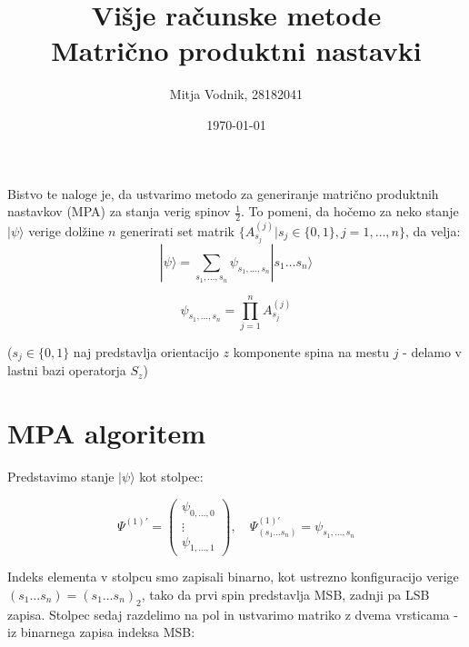 \documentclass[a4paper]{article}
\newcommand{\half}{\frac{1}{2}}
\newcommand{\ket}[1]{|#1\rangle}
\newcommand{\range}[2]{#1, \ldots, #2}
\newcommand{\seq}[2]{#1 \ldots #2}
\newcommand{\psiCoef}[2]{\psi_{\range{#1}{#2}}}
\newcommand{\mpa}[2]{#1^{(#2)}_{s_#2}}
\begin{document}
    \title{\sc\large Višje računske metode\\
		\bigskip
		\bf\Large Matrično produktni nastavki}
	\author{Mitja Vodnik, 28182041}
            \date{\today}
	\maketitle

    Bistvo te naloge je, da ustvarimo metodo za generiranje matrično produktnih nastavkov (MPA) za stanja verig spinov $\half$.
    To pomeni, da hočemo za neko stanje $\ket{\psi}$ verige dolžine $n$ generirati set matrik
    $\big\{\mpa{A}{j} | s_j \in \{0, 1\}, j = \range{1}{n}\big\}$, da velja:\\

    \begin{equation}\label{eq1}
        \ket{\psi} = \sum_{\range{s_1}{s_n}} \psiCoef{s_1}{s_n} \ket{\seq{s_1}{s_n}}
    \end{equation}

    \begin{equation}\label{eq2}
        \psiCoef{s_1}{s_n} = \prod_{j=1}^{n} \mpa{A}{j}
    \end{equation}

    ($s_j \in \{0, 1\}$ naj predstavlja orientacijo $z$ komponente spina na mestu $j$ - delamo v lastni bazi operatorja $S_z$)

    \section{MPA algoritem} 

    Predstavimo stanje $\ket{\psi}$ kot stolpec:

    \begin{equation}\label{eq3}
        \Psi^{(1)\prime} = \begin{pmatrix} \psiCoef{0}{0} \\ \vdots \\ \psiCoef{1}{1} \end{pmatrix}, \quad
            \Psi^{(1)\prime}_{(\seq{s_1}{s_n})} = \psiCoef{s_1}{s_n}
    \end{equation}

    Indeks elementa v stolpcu smo zapisali binarno, kot ustrezno konfiguracijo verige $(\seq{s_1}{s_n}) = (\seq{s_1}{s_n})_2$, tako da prvi spin
    predstavlja MSB, zadnji pa LSB zapisa. Stolpec sedaj razdelimo na pol in ustvarimo matriko z dvema vrsticama - iz binarnega zapisa indeksa
     MSB:
\end{document}
